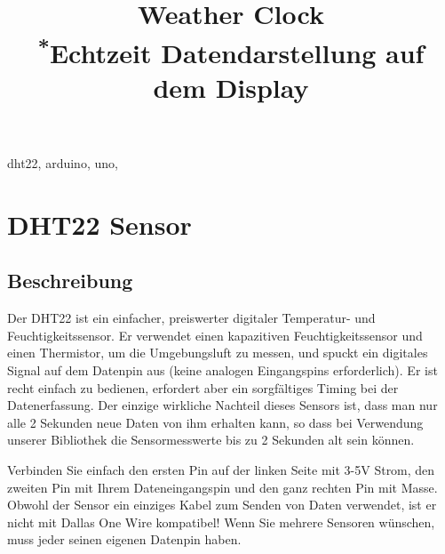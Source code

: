 \documentclass[conference]{IEEEtran}
\begin{document}
\title{Weather Clock\\
{\footnotesize \textsuperscript{*}Echtzeit Datendarstellung auf dem Display}
}

\author{
\and
{}
}

\maketitle

\begin{abstract}

\end{abstract}

\begin{IEEEkeywords}
dht22, arduino, uno, 
\end{IEEEkeywords}

\section{DHT22 Sensor}

\subsection{Beschreibung}
Der DHT22 ist ein einfacher, preiswerter digitaler Temperatur- und Feuchtigkeitssensor. Er verwendet einen kapazitiven Feuchtigkeitssensor und einen Thermistor, um die Umgebungsluft zu messen, und spuckt ein digitales Signal auf dem Datenpin aus (keine analogen Eingangspins erforderlich). Er ist recht einfach zu bedienen, erfordert aber ein sorgfältiges Timing bei der Datenerfassung. Der einzige wirkliche Nachteil dieses Sensors ist, dass man nur alle 2 Sekunden neue Daten von ihm erhalten kann, so dass bei Verwendung unserer Bibliothek die Sensormesswerte bis zu 2 Sekunden alt sein können.

Verbinden Sie einfach den ersten Pin auf der linken Seite mit 3-5V Strom, den zweiten Pin mit Ihrem Dateneingangspin und den ganz rechten Pin mit Masse. Obwohl der Sensor ein einziges Kabel zum Senden von Daten verwendet, ist er nicht mit Dallas One Wire kompatibel! Wenn Sie mehrere Sensoren wünschen, muss jeder seinen eigenen Datenpin haben.
\end{document}
